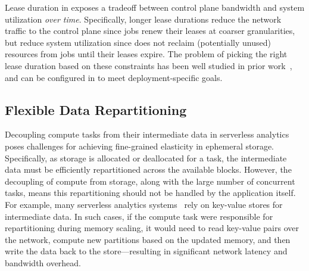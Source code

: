  Lease duration in \jiffy exposes a tradeoff between control plane bandwidth and system utilization \textit{over time}. Specifically, longer lease durations reduce the network traffic to the control plane since jobs renew their leases at coarser granularities, but reduce system utilization since \jiffy does not reclaim (potentially unused) resources from jobs until their leases expire. The problem of picking the right lease duration based on these constraints has been well studied in prior work~\cite{chubby, gray1989leases}, and can be configured in \jiffy to meet deployment-specific goals.


\subsection{Flexible Data Repartitioning}
\label{ssec:fdr}

Decoupling compute tasks from their intermediate data in serverless analytics poses challenges for achieving fine-grained elasticity in ephemeral storage. Specifically, as storage is allocated or deallocated for a task, the intermediate data must be efficiently repartitioned across the available blocks. However, the decoupling of compute from storage, along with the large number of concurrent tasks, means this repartitioning should not be handled by the application itself. For example, many serverless analytics systems~\cite{locus, pocket} rely on key-value stores for intermediate data. In such cases, if the compute task were responsible for repartitioning during memory scaling, it would need to read key-value pairs over the network, compute new partitions based on the updated memory, and then write the data back to the store—resulting in significant network latency and bandwidth overhead.

 

